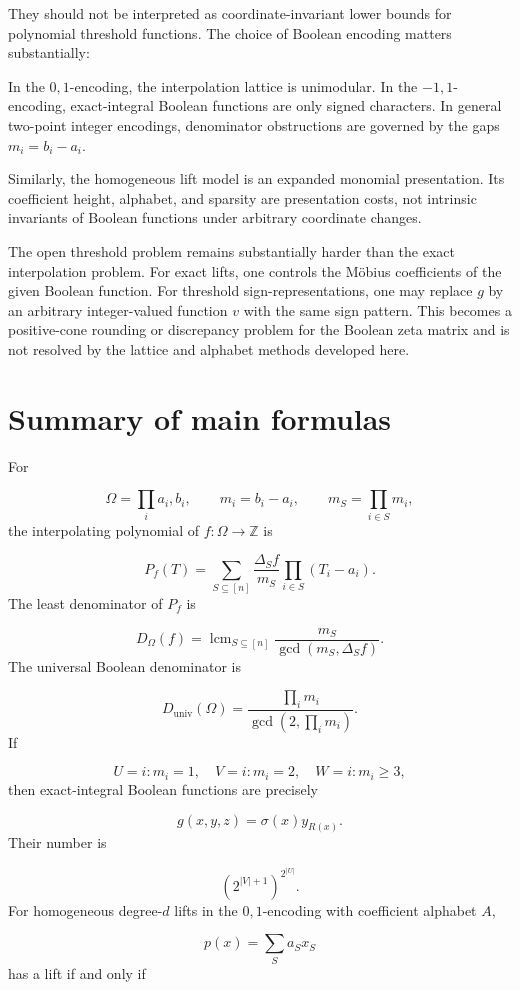 \documentclass[11pt]{article}
\theoremstyle{definition}
\begin{document}
They should not be interpreted as coordinate-invariant lower bounds for polynomial threshold functions. The choice of Boolean encoding matters substantially:

In the ${0,1}$-encoding, the interpolation lattice is unimodular. In the ${-1,1}$-encoding, exact-integral Boolean functions are only signed characters. In general two-point integer encodings, denominator obstructions are governed by the gaps $m_i=b_i-a_i$.

Similarly, the homogeneous lift model is an expanded monomial presentation. Its coefficient height, alphabet, and sparsity are presentation costs, not intrinsic invariants of Boolean functions under arbitrary coordinate changes.

The open threshold problem remains substantially harder than the exact interpolation problem. For exact lifts, one controls the Möbius coefficients of the given Boolean function. For threshold sign-representations, one may replace $g$ by an arbitrary integer-valued function $v$ with the same sign pattern. This becomes a positive-cone rounding or discrepancy problem for the Boolean zeta matrix and is not resolved by the lattice and alphabet methods developed here.

\section{Summary of main formulas}
For

\[
\Omega=\prod_i{a_i,b_i},
\qquad
m_i=b_i-a_i,
\qquad
m_S=\prod_{i\in S}m_i,
\]
the interpolating polynomial of $f:\Omega\to\mathbb{Z}$ is

\[
P_f(T)
=
\sum_{S\subseteq[n]}
\frac{\Delta_S f}{m_S}
\prod_{i\in S}(T_i-a_i).
\]
The least denominator of $P_f$ is

\[
D_\Omega(f)
=
\operatorname{lcm}_{S\subseteq[n]}
\frac{m_S}{\gcd(m_S,\Delta_S f)}.
\]
The universal Boolean denominator is

\[
D_{\mathrm{univ}}(\Omega)
=
\frac{\prod_i m_i}{\gcd(2,\prod_i m_i)}.
\]
If

\[
U={i:m_i=1},\quad
V={i:m_i=2},\quad
W={i:m_i\ge3},
\]
then exact-integral Boolean functions are precisely

\[
g(x,y,z)=\sigma(x)y_{R(x)}.
\]
Their number is

\[
\left(2^{|V|+1}\right)^{2^{|U|}}.
\]
For homogeneous degree-$d$ lifts in the ${0,1}$-encoding with coefficient alphabet $A$,

\[
p(x)=\sum_Sa_Sx_S
\]
has a lift if and only if
\end{document}
